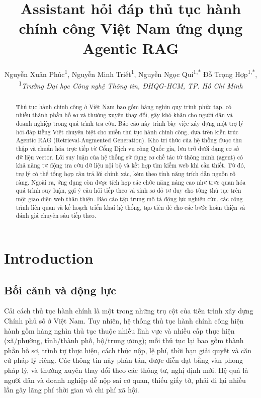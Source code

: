 \documentclass[11pt]{article}
\title{\textbf{Assistant hỏi đáp thủ tục hành chính công Việt Nam ứng dụng Agentic RAG}}
\author{
    Nguyễn Xuân Phúc\textsuperscript{1},
    Nguyễn Minh Triết\textsuperscript{1},
    Nguyễn Ngọc Quí\textsuperscript{1,*}
    Đỗ Trọng Hợp\textsuperscript{1,*},\\
    \vspace{0.3cm}
    \small \textsuperscript{1}\textit{Trường Đại học Công nghệ Thông tin, ĐHQG-HCM, TP. Hồ Chí Minh}
}
\date{}
\begin{document}
\maketitle
\let\thefootnote\relax{}

\begin{abstract}
Thủ tục hành chính công ở Việt Nam bao gồm hàng nghìn quy trình phức tạp, có nhiều thành phần hồ sơ và thường xuyên thay đổi, gây khó khăn cho người dân và doanh nghiệp trong quá trình tra cứu. Báo cáo này trình bày việc xây dựng một trợ lý hỏi-đáp tiếng Việt chuyên biệt cho miền thủ tục hành chính công, dựa trên kiến trúc Agentic RAG (Retrieval-Augmented Generation). Kho tri thức của hệ thống được thu thập và chuẩn hóa trực tiếp từ Cổng Dịch vụ công Quốc gia, lưu trữ dưới dạng cơ sở dữ liệu vector. Lõi suy luận của hệ thống sử dụng cơ chế tác tử thông minh (agent) có khả năng tự động tra cứu dữ liệu nội bộ và kết hợp tìm kiếm web khi cần thiết. Từ đó, trợ lý có thể tổng hợp câu trả lời chính xác, kèm theo tính năng trích dẫn nguồn rõ ràng. Ngoài ra, ứng dụng còn được tích hợp các chức năng nâng cao như trực quan hóa quá trình suy luận, gợi ý câu hỏi tiếp theo và sinh sơ đồ tư duy cho từng thủ tục trên một giao diện web thân thiện. Báo cáo tập trung mô tả động lực nghiên cứu, các công trình liên quan và kế hoạch triển khai hệ thống, tạo tiền đề cho các bước hoàn thiện và đánh giá chuyên sâu tiếp theo.
\end{abstract}

\section{Introduction}

\subsection{Bối cảnh và động lực}

Cải cách thủ tục hành chính là một trong những trụ cột của tiến trình xây dựng Chính phủ số ở Việt Nam. Tuy nhiên, hệ thống thủ tục hành chính công hiện hành gồm hàng nghìn thủ tục thuộc nhiều lĩnh vực và nhiều cấp thực hiện (xã/phường, tỉnh/thành phố, bộ/trung ương); mỗi thủ tục lại bao gồm thành phần hồ sơ, trình tự thực hiện, cách thức nộp, lệ phí, thời hạn giải quyết và căn cứ pháp lý riêng. Các thông tin này phân tán, được diễn đạt bằng văn phong pháp lý, và thường xuyên thay đổi theo các thông tư, nghị định mới. Hệ quả là người dân và doanh nghiệp dễ nộp sai cơ quan, thiếu giấy tờ, phải đi lại nhiều lần gây lãng phí thời gian và chi phí xã hội.
\end{document}
